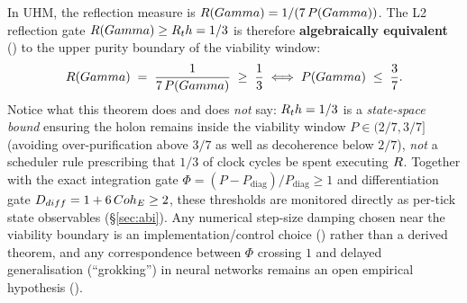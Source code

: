 In UHM, the reflection measure is $R(Gamma) = 1/(7\,P(Gamma))$. The L2 reflection
gate $R(Gamma) \ge R_th = 1/3$ is therefore \textbf{algebraically equivalent}
() to the upper purity boundary of the viability window:
\[
R(Gamma) \;=\; \frac{1}{7\,P(Gamma)} \;\ge\; \frac{1}{3}
\;\Longleftrightarrow\;
P(Gamma) \;\le\; \frac{3}{7}.
\]
Notice what this theorem does and does \emph{not} say: $R_th=1/3$ is a
\emph{state-space bound} ensuring the holon remains inside the viability window
$P\in(2/7,3/7]$ (avoiding over-purification above $3/7$ as well as decoherence
below $2/7$), \emph{not} a scheduler rule prescribing that $1/3$ of clock
cycles be spent executing $R$. Together with the exact integration gate
$\Phi=(P-P_{\mathrm{diag}})/P_{\mathrm{diag}}\ge 1$ and differentiation gate
$D_{diff}=1+6\,Coh_E\ge 2$, these thresholds are monitored directly as
per-tick state observables (\S\ref{sec:abi}). Any numerical step-size damping
chosen near the viability boundary is an implementation/control choice
() rather than a derived theorem, and any correspondence between
$\Phi$ crossing $1$ and delayed generalisation (``grokking'') in neural
networks remains an open empirical hypothesis ().
